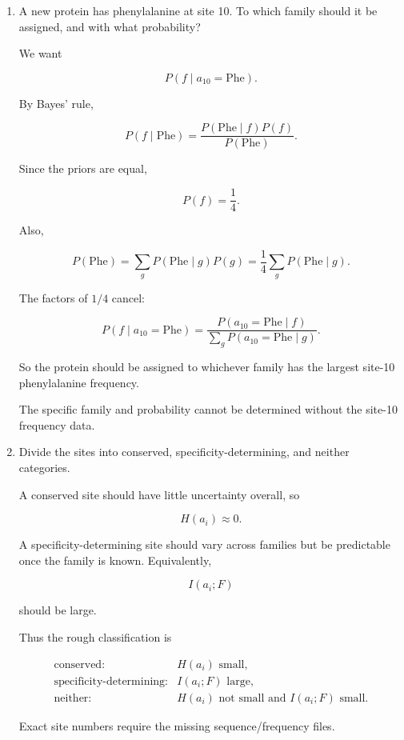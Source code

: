 \documentclass[11pt]{article}
\begin{document}
\begin{enumerate}
\[
I(a_i;F)\leq H(F).
\]

Since there are four equally likely families,

\[
H(F)
=
-\sum_{f=1}^4
\frac14\log_2\frac14
=
2\text{ bits}.
\]

Therefore

\[
0\leq I(a_i;F)\leq2\text{ bits}.
\]

Numerical values for each site require the supplied data files.

\item A new protein has phenylalanine at site 10. To which family should
it be assigned, and with what probability?

We want

\[
P(f\mid a_{10}=\mathrm{Phe}).
\]

By Bayes' rule,

\[
P(f\mid\mathrm{Phe})
=
\frac{
P(\mathrm{Phe}\mid f)P(f)
}{
P(\mathrm{Phe})
}.
\]

Since the priors are equal,

\[
P(f)=\frac14.
\]

Also,

\[
P(\mathrm{Phe})
=
\sum_g
P(\mathrm{Phe}\mid g)P(g)
=
\frac14
\sum_g
P(\mathrm{Phe}\mid g).
\]

The factors of \(1/4\) cancel:

\[
P(f\mid a_{10}=\mathrm{Phe})
=
\frac{
P(a_{10}=\mathrm{Phe}\mid f)
}{
\sum_g
P(a_{10}=\mathrm{Phe}\mid g)
}.
\]

So the protein should be assigned to whichever family has the largest
site-10 phenylalanine frequency.

The specific family and probability cannot be determined without the
site-10 frequency data.

\item Divide the sites into conserved, specificity-determining, and
neither categories.

A conserved site should have little uncertainty overall, so

\[
H(a_i)\approx0.
\]

A specificity-determining site should vary across families but be predictable
once the family is known. Equivalently,

\[
I(a_i;F)
\]

should be large.

Thus the rough classification is

\[
\begin{array}{ll}
\text{conserved:}
&
H(a_i)\text{ small},
\\[0.4em]
\text{specificity-determining:}
&
I(a_i;F)\text{ large},
\\[0.4em]
\text{neither:}
&
H(a_i)\text{ not small and }I(a_i;F)\text{ small}.
\end{array}
\]

Exact site numbers require the missing sequence/frequency files.

\end{enumerate}
\end{document}
